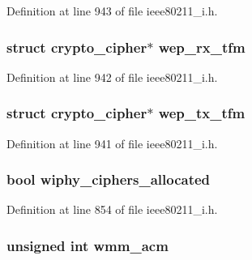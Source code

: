 Definition at line 943 of file ieee80211\-\_\-i.\-h.

\hypertarget{structieee80211__local_a993e1c97083f7fe3b90b9da910d72bd7}{
\subsubsection[{wep\-\_\-rx\-\_\-tfm}]{\setlength{\rightskip}{0pt plus 5cm}struct crypto\-\_\-cipher$\ast$ wep\-\_\-rx\-\_\-tfm}}\label{structieee80211__local_a993e1c97083f7fe3b90b9da910d72bd7}


Definition at line 942 of file ieee80211\-\_\-i.\-h.

\hypertarget{structieee80211__local_ab554bf57d377855ad08d970f9e395ad0}{
\subsubsection[{wep\-\_\-tx\-\_\-tfm}]{\setlength{\rightskip}{0pt plus 5cm}struct crypto\-\_\-cipher$\ast$ wep\-\_\-tx\-\_\-tfm}}\label{structieee80211__local_ab554bf57d377855ad08d970f9e395ad0}


Definition at line 941 of file ieee80211\-\_\-i.\-h.

\hypertarget{structieee80211__local_a257c289b6a875f6028f1e79f4c0241bc}{
\subsubsection[{wiphy\-\_\-ciphers\-\_\-allocated}]{\setlength{\rightskip}{0pt plus 5cm}bool wiphy\-\_\-ciphers\-\_\-allocated}}\label{structieee80211__local_a257c289b6a875f6028f1e79f4c0241bc}


Definition at line 854 of file ieee80211\-\_\-i.\-h.

\hypertarget{structieee80211__local_ae7863966f2b9005eeb21a687f9f5a5a3}{
\subsubsection[{wmm\-\_\-acm}]{\setlength{\rightskip}{0pt plus 5cm}unsigned int wmm\-\_\-acm}}\label{structieee80211__local_ae7863966f2b9005eeb21a687f9f5a5a3}


